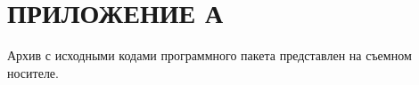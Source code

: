\documentclass[../main]{subfiles}
\begin{document}
\newpage
{}
\label{sec:appendix1}
\section*{ПРИЛОЖЕНИЕ А}

Архив с исходными кодами программного пакета представлен на съемном носителе.
\end{document}
